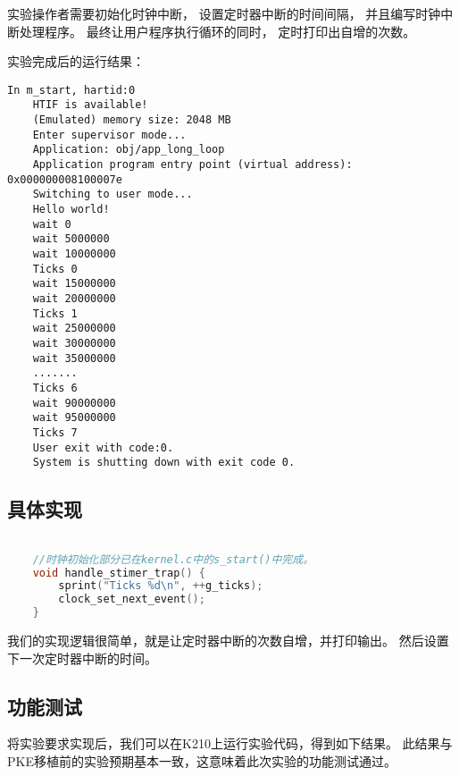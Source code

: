 实验操作者需要初始化时钟中断，
设置定时器中断的时间间隔，
并且编写时钟中断处理程序。
最终让用户程序执行循环的同时，
定时打印出自增的次数。

实验完成后的运行结果：

\begin{lstlisting}[caption={lab3实验结果（移植K210前）}, label={lst:app_long_loop_result_before}]
    In m_start, hartid:0
    HTIF is available!
    (Emulated) memory size: 2048 MB
    Enter supervisor mode...
    Application: obj/app_long_loop
    Application program entry point (virtual address): 0x000000008100007e
    Switching to user mode...
    Hello world!
    wait 0
    wait 5000000
    wait 10000000
    Ticks 0
    wait 15000000
    wait 20000000
    Ticks 1
    wait 25000000
    wait 30000000
    wait 35000000
    .......
    Ticks 6
    wait 90000000
    wait 95000000
    Ticks 7
    User exit with code:0.
    System is shutting down with exit code 0.    
\end{lstlisting}

\subsection{具体实现}

\begin{lstlisting}[caption={定时器中断处理程序}, label={lst:app_timer_handler}, language=C]

    //时钟初始化部分已在kernel.c中的s_start()中完成。
    void handle_stimer_trap() {
        sprint("Ticks %d\n", ++g_ticks);
        clock_set_next_event();
    }    
\end{lstlisting}

我们的实现逻辑很简单，就是让定时器中断的次数自增，并打印输出。
然后设置下一次定时器中断的时间。

\subsection{功能测试}

将实验要求实现后，我们可以在K210上运行实验代码，得到如下结果。
此结果与PKE移植前的实验预期基本一致，这意味着此次实验的功能测试通过。

